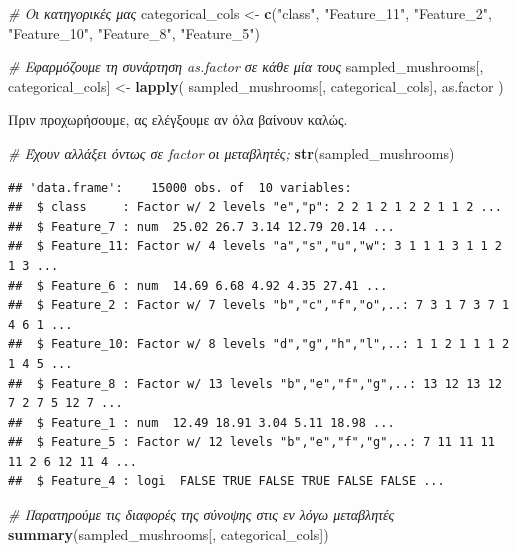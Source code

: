 \documentclass[
]{article}
\newenvironment{Shaded}{\begin{snugshade}}{\end{snugshade}}
\newcommand{\CommentTok}[1]{\textcolor[rgb]{0.56,0.35,0.01}{\textit{#1}}}
\newcommand{\FunctionTok}[1]{\textcolor[rgb]{0.13,0.29,0.53}{\textbf{#1}}}
\newcommand{\NormalTok}[1]{#1}
\newcommand{\OtherTok}[1]{\textcolor[rgb]{0.56,0.35,0.01}{#1}}
\newcommand{\StringTok}[1]{\textcolor[rgb]{0.31,0.60,0.02}{#1}}
\begin{document}
\begin{Shaded}
\begin{Highlighting}[]
\CommentTok{\# Οι κατηγορικές μας}
\NormalTok{categorical\_cols }\OtherTok{\textless{}{-}} \FunctionTok{c}\NormalTok{(}\StringTok{"class"}\NormalTok{, }\StringTok{"Feature\_11"}\NormalTok{, }\StringTok{"Feature\_2"}\NormalTok{, }\StringTok{"Feature\_10"}\NormalTok{, }\StringTok{"Feature\_8"}\NormalTok{, }\StringTok{"Feature\_5"}\NormalTok{)}

\CommentTok{\# Εφαρμόζουμε τη συνάρτηση as.factor σε κάθε μία τους}
\NormalTok{sampled\_mushrooms[, categorical\_cols] }\OtherTok{\textless{}{-}} \FunctionTok{lapply}\NormalTok{(}
\NormalTok{  sampled\_mushrooms[, categorical\_cols], }
\NormalTok{  as.factor}
\NormalTok{)}
\end{Highlighting}
\end{Shaded}

Πριν προχωρήσουμε, ας ελέγξουμε αν όλα βαίνουν καλώς.

\begin{Shaded}
\begin{Highlighting}[]
\CommentTok{\# Έχουν αλλάξει όντως σε factor οι μεταβλητές;}
\FunctionTok{str}\NormalTok{(sampled\_mushrooms)}
\end{Highlighting}
\end{Shaded}

\begin{verbatim}
## 'data.frame':    15000 obs. of  10 variables:
##  $ class     : Factor w/ 2 levels "e","p": 2 2 1 2 1 2 2 1 1 2 ...
##  $ Feature_7 : num  25.02 26.7 3.14 12.79 20.14 ...
##  $ Feature_11: Factor w/ 4 levels "a","s","u","w": 3 1 1 1 3 1 1 2 1 3 ...
##  $ Feature_6 : num  14.69 6.68 4.92 4.35 27.41 ...
##  $ Feature_2 : Factor w/ 7 levels "b","c","f","o",..: 7 3 1 7 3 7 1 4 6 1 ...
##  $ Feature_10: Factor w/ 8 levels "d","g","h","l",..: 1 1 2 1 1 1 2 1 4 5 ...
##  $ Feature_8 : Factor w/ 13 levels "b","e","f","g",..: 13 12 13 12 7 2 7 5 12 7 ...
##  $ Feature_1 : num  12.49 18.91 3.04 5.11 18.98 ...
##  $ Feature_5 : Factor w/ 12 levels "b","e","f","g",..: 7 11 11 11 11 2 6 12 11 4 ...
##  $ Feature_4 : logi  FALSE TRUE FALSE TRUE FALSE FALSE ...
\end{verbatim}

\begin{Shaded}
\begin{Highlighting}[]
\CommentTok{\# Παρατηρούμε τις διαφορές της σύνοψης στις εν λόγω μεταβλητές}
\FunctionTok{summary}\NormalTok{(sampled\_mushrooms[, categorical\_cols])}
\end{Highlighting}
\end{Shaded}
\end{document}
